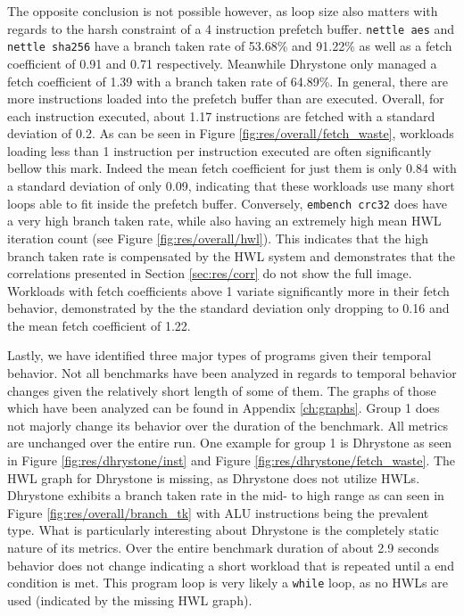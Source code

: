 \documentclass[../bachelor_paper.tex]{subfiles}
\begin{document}
The opposite conclusion is not possible however, as loop size also matters with regards to the harsh constraint of a 4 instruction prefetch buffer. \texttt{nettle aes} and \texttt{nettle sha256} have a branch taken rate of 53.68\% and 91.22\% as well as a fetch coefficient of 0.91 and 0.71 respectively. Meanwhile Dhrystone only managed a fetch coefficient of 1.39 with a branch taken rate of 64.89\%. In general, there are more instructions loaded into the prefetch buffer than are executed. Overall, for each instruction executed, about 1.17 instructions are fetched with a standard deviation of 0.2. As can be seen in Figure \ref{fig:res/overall/fetch_waste}, workloads loading less than 1 instruction per instruction executed are often significantly bellow this mark. Indeed the mean fetch coefficient for just them is only 0.84 with a standard deviation of only 0.09, indicating that these workloads use many short loops able to fit inside the prefetch buffer. Conversely, \texttt{embench crc32} does have a very high branch taken rate, while also having an extremely high mean \ac{HWL} iteration count (see Figure \ref{fig:res/overall/hwl}). This indicates that the high branch taken rate is compensated by the \ac{HWL} system and demonstrates that the correlations presented in Section \ref{sec:res/corr} do not show the full image.\\
Workloads with fetch coefficients above 1 variate significantly more in their fetch behavior, demonstrated by the the standard deviation only dropping to 0.16 and the mean fetch coefficient of 1.22.

Lastly, we have identified three major types of programs given their temporal behavior. Not all benchmarks have been analyzed in regards to temporal behavior changes given the relatively short length of some of them. The graphs of those which have been analyzed can be found in Appendix \ref{ch:graphs}. Group 1 does not majorly change its behavior over the duration of the benchmark. All metrics are unchanged over the entire run. One example for group 1 is Dhrystone as seen in Figure \ref{fig:res/dhrystone/inst} and Figure \ref{fig:res/dhrystone/fetch_waste}. The \ac{HWL} graph for Dhrystone is missing, as Dhrystone does not utilize \acp{HWL}. Dhrystone exhibits a branch taken rate in the mid- to high range as can seen in Figure \ref{fig:res/overall/branch_tk} with \ac{ALU} instructions being the prevalent type. What is particularly interesting about Dhrystone is the completely static nature of its metrics. Over the entire benchmark duration of about 2.9 seconds behavior does not change indicating a short workload that is repeated until a end condition is met. This program loop is very likely a \texttt{while} loop, as no \acp{HWL} are used (indicated by the missing \ac{HWL} graph).
\end{document}
